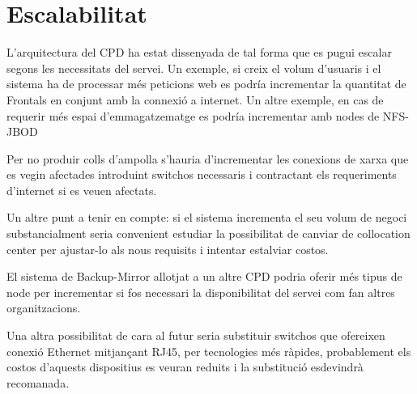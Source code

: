 \section{Escalabilitat}

L'arquitectura del CPD ha estat dissenyada de tal forma que es pugui escalar segons les necessitats del servei. Un exemple, si creix el volum d'usuaris i el sistema ha de processar més peticions web es podría incrementar la quantitat de Frontals en conjunt amb la connexió a internet. Un altre exemple, en cas de requerir més espai d'emmagatzematge es podría incrementar amb nodes de NFS-JBOD

Per no produir colls d'ampolla s'hauria d'incrementar les conexions de xarxa que es vegin afectades introduint switchos necessaris i contractant els requeriments d'internet si es veuen afectats.

Un altre punt a tenir en compte: si el sistema incrementa el seu volum de negoci substancialment seria convenient estudiar la possibilitat de canviar de collocation center per ajustar-lo als nous requisits i intentar estalviar costos.

El sistema de Backup-Mirror allotjat a un altre CPD podria oferir més tipus de node per incrementar si fos necessari la disponibilitat del servei com fan altres organitzacions.

Una altra possibilitat de cara al futur seria substituir switchos que ofereixen conexió Ethernet mitjançant RJ45, per tecnologies més ràpides, probablement els costos d'aquests dispositius es veuran reduits i la substitució esdevindrà recomanada.
